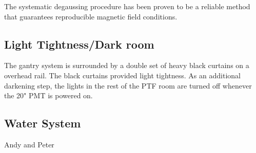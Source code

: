 The systematic degaussing procedure has been proven to be a reliable method that guarantees reproducible magnetic field conditions. 















\subsection{Light Tightness/Dark room}

The gantry system is surrounded by a double set of heavy black
curtains on a overhead rail.  The black curtains provided light tightness.
As an additional darkening step, the lights in the rest of the PTF room
are turned off whenever the 20" PMT is powered on.


\subsection{Water System}
Andy and Peter

